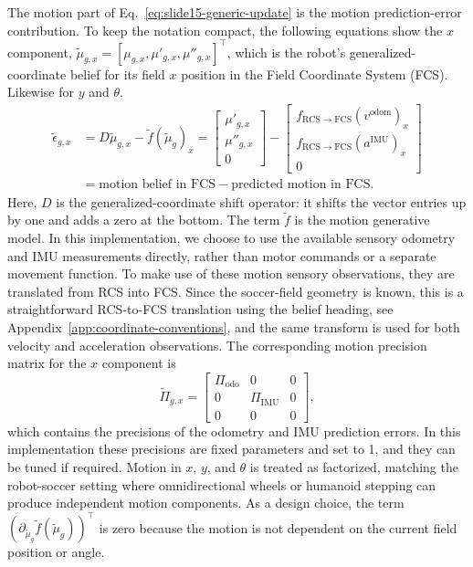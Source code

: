 The motion part of Eq.~\ref{eq:slide15-generic-update} is the motion prediction-error contribution.
To keep the notation compact, the following equations show the $x$ component, $\tilde{\mu}_{g,x}=[\mu_{g,x},\mu'_{g,x},\mu''_{g,x}]^\top$, which is the robot's generalized-coordinate belief for its field $x$ position in the Field Coordinate System (FCS). Likewise for $y$ and $\theta$.
\begin{align}
    \tilde{\epsilon}_{g,x}
    &=
    D\tilde{\mu}_{g,x}
    -
    \tilde{f}(\tilde{\mu}_g)_x
    =
    \begin{bmatrix}
        \mu'_{g,x} \\
        \mu''_{g,x} \\
        0
    \end{bmatrix}
    -
    \begin{bmatrix}
        f_{\mathrm{RCS}\rightarrow\mathrm{FCS}}(v^{\mathrm{odom}})_x \\
        f_{\mathrm{RCS}\rightarrow\mathrm{FCS}}(a^{\mathrm{IMU}})_x \\
        0
    \end{bmatrix}
    \nonumber \\
    &=
    \text{motion belief in FCS}
    -
    \text{predicted motion in FCS}.
    \label{eq:motion-error-x}
\end{align}
Here, $D$ is the generalized-coordinate shift operator: it shifts the vector entries up by one and adds a zero at the bottom.
The term $\tilde{f}$ is the motion generative model. In this implementation, we choose to use the available sensory odometry and IMU measurements directly, rather than motor commands or a separate movement function. To make use of these motion sensory observations, they are translated from RCS into FCS. Since the soccer-field geometry is known, this is a straightforward RCS-to-FCS translation using the belief heading, see Appendix~\ref{app:coordinate-conventions}, and the same transform is used for both velocity and acceleration observations.
The corresponding motion precision matrix for the $x$ component is
\begin{equation}
    \tilde{\Pi}_{g,x}
    =
    \begin{bmatrix}
        \Pi_{\mathrm{odo}} & 0 & 0 \\
        0 & \Pi_{\mathrm{IMU}} & 0 \\
        0 & 0 & 0
    \end{bmatrix},
    \label{eq:motion-precision-x}
\end{equation}
which contains the precisions of the odometry and IMU prediction errors. In this implementation these precisions are fixed parameters and set to 1, and they can be tuned if required. Motion in $x$, $y$, and $\theta$ is treated as factorized, matching the robot-soccer setting where omnidirectional wheels or humanoid stepping can produce independent motion components. As a design choice, the term $\left(\partial_{\tilde\mu_g}\tilde{f}(\tilde{\mu}_g)\right)^\top$ is zero because the motion is not dependent on the current field position or angle.

